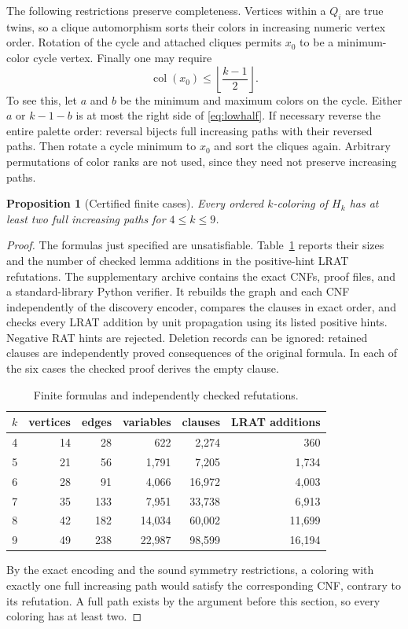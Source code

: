\documentclass[11pt]{amsart}
\newtheorem{proposition}[theorem]{Proposition}
\newcommand{\col}{\operatorname{col}}
\begin{document}
The following restrictions preserve completeness.  Vertices within a
$Q_i$ are true twins, so a clique automorphism sorts their colors in
increasing numeric vertex order.  Rotation of the cycle and attached
cliques permits $x_0$ to be a minimum-color cycle vertex.  Finally
one may require
\begin{equation}\label{eq:lowhalf}
 \col(x_0)\leq\left\lfloor\frac{k-1}{2}\right\rfloor.
\end{equation}
To see this, let $a$ and $b$ be the minimum and maximum colors on the
cycle.  Either $a$ or $k-1-b$ is at most the right side of
\eqref{eq:lowhalf}.  If necessary reverse the entire palette order:
reversal bijects full increasing paths with their reversed paths.
Then rotate a cycle minimum to $x_0$ and sort the cliques again.
Arbitrary permutations of color ranks are not used, since they need
not preserve increasing paths.

\begin{proposition}[Certified finite cases]\label{prop:finite}
Every ordered $k$-coloring of $H_k$ has at least two full increasing
paths for $4\leq k\leq9$.
\end{proposition}

\begin{proof}
The formulas just specified are unsatisfiable.  Table~\ref{tab:checks}
reports their sizes and the number of checked lemma additions in the
positive-hint LRAT refutations.  The supplementary archive contains
the exact CNFs, proof files, and a standard-library Python verifier.
It rebuilds the graph and each CNF independently of the discovery
encoder, compares the clauses in exact order, and checks every LRAT
addition by unit propagation using its listed positive hints.
Negative RAT hints are rejected.  Deletion records can be ignored:
retained clauses are independently proved consequences of the
original formula.  In each of the six cases the checked proof derives
the empty clause.

\begin{table}[ht]
\centering
\caption{Finite formulas and independently checked refutations.}
\label{tab:checks}
\begin{tabular}{rrrrrr}
\toprule
$k$& vertices& edges& variables& clauses& LRAT additions\\
\midrule
4&14&28&622&2,274&360\\
5&21&56&1,791&7,205&1,734\\
6&28&91&4,066&16,972&4,003\\
7&35&133&7,951&33,738&6,913\\
8&42&182&14,034&60,002&11,699\\
9&49&238&22,987&98,599&16,194\\
\bottomrule
\end{tabular}
\end{table}

By the exact encoding and the sound symmetry restrictions, a coloring
with exactly one full increasing path would satisfy the corresponding
CNF, contrary to its refutation.  A full path exists by the argument
before this section, so every coloring has at least two.
\end{proof}
\end{document}
